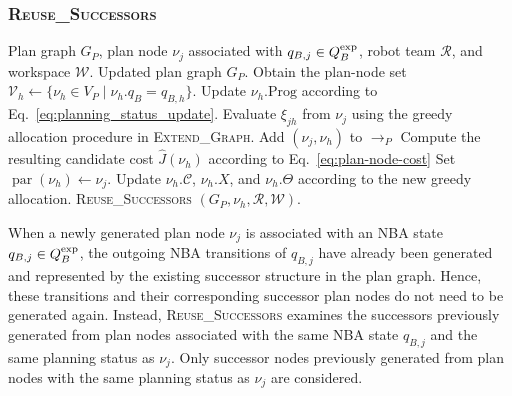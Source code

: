 \documentclass[lettersize,journal]{IEEEtran}
\theoremstyle{italiclemma}
\theoremstyle{italiclemma}
\theoremstyle{definition}
\begin{document}
\subsubsection{\textsc{Reuse\_Successors}}

\begin{algorithm}[H]
\caption{\textsc{Reuse\_Successors}}
\label{alg:reuse_successors}
\begin{algorithmic}[1]
\REQUIRE Plan graph $G_P$, plan node $\nu_j$ associated with $q_{B,j}\in Q_B^{\rm exp}$, robot team $\mathcal R$, and workspace $\mathcal W$.
\ENSURE Updated plan graph \(G_P\).
     \STATE Obtain the plan-node set $\mathcal V_h \gets \{\nu_h\in V_P \mid \nu_h.q_B=q_{B,h}\}.$
        \STATE Update $\nu_h.\mathrm{Prog}$ according to Eq.~\eqref{eq:planning_status_update}.
        \STATE Evaluate $\xi_{jh}$ from $\nu_j$ using the greedy allocation procedure in \textsc{Extend\_Graph}.
            \STATE {}
        \ENDIF
        \STATE Add $(\nu_j,\nu_h)$ to $\rightarrow_P$
        \STATE Compute the resulting candidate cost
$\widehat J(\nu_h)$ according to Eq.~\eqref{eq:plan-node-cost}
    \STATE Set $\operatorname{par}(\nu_h)\gets\nu_j$.
    \STATE Update $\nu_h.\mathcal C$, $\nu_h.X$, and
    $\nu_h.\Theta$ according to the new greedy allocation.
    \STATE \textsc{Reuse\_Successors}
    $(G_P,\nu_h,\mathcal R,\mathcal W)$.
\ENDIF
\ENDFOR
\ENDFOR
\end{algorithmic}
\end{algorithm}

When a newly generated plan node $\nu_j$ is associated with an NBA state $q_{B,j}\in Q_B^{\rm exp}$, the outgoing NBA transitions of $q_{B,j}$ have already been generated and represented by the existing successor structure in the plan graph. Hence, these transitions and their corresponding successor plan nodes do not need to be generated again. Instead, \textsc{Reuse\_Successors} examines the successors previously generated from plan nodes associated with the same NBA state $q_{B,j}$ and the same planning status as $\nu_j$. Only successor nodes previously generated from plan nodes with the same
planning status as $\nu_j$ are considered.
\end{document}
